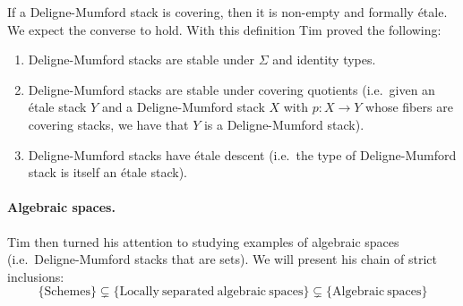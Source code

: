 \documentclass[letterpaper]{../../util/easychair}
\begin{document}
If a Deligne-Mumford stack is covering, then it is non-empty and formally étale. We expect the converse to hold. With this definition Tim proved the following:
\begin{enumerate}
\item Deligne-Mumford stacks are stable under $\Sigma$ and identity types.
\item Deligne-Mumford stacks are stable under covering quotients (i.e.\ given an étale stack $Y$ and a Deligne-Mumford stack $X$ with $p:X\to Y$ whose fibers are covering stacks, we have that $Y$ is a Deligne-Mumford stack).
\item Deligne-Mumford stacks have étale descent (i.e.\ the type of Deligne-Mumford stack is itself an étale stack).
\end{enumerate}



\paragraph*{Algebraic spaces.}

Tim then turned his attention to studying examples of algebraic spaces (i.e.\ Deligne-Mumford stacks that are sets). We will present his chain of strict inclusions:
\[\{\mathrm{Schemes}\} \subsetneq \{\mathrm{Locally\ separated\ algebraic\ spaces}\} \subsetneq \{\mathrm{Algebraic\ spaces}\}\] 


\printbibliography
\end{document}
